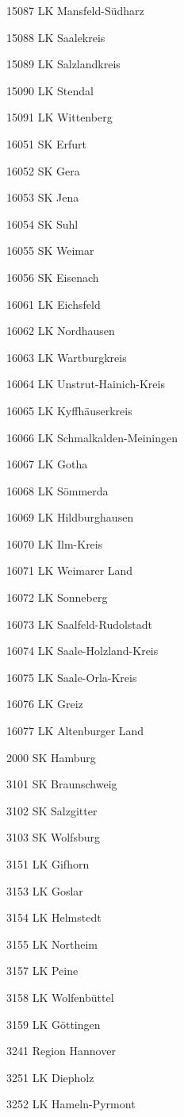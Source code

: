 15087  LK Mansfeld-Südharz

15088  LK Saalekreis

15089  LK Salzlandkreis

15090  LK Stendal

15091  LK Wittenberg

16051  SK Erfurt

16052  SK Gera

16053  SK Jena

16054  SK Suhl

16055  SK Weimar

16056  SK Eisenach

16061  LK Eichsfeld

16062  LK Nordhausen

16063  LK Wartburgkreis

16064  LK Unstrut-Hainich-Kreis

16065  LK Kyffhäuserkreis

16066  LK Schmalkalden-Meiningen

16067  LK Gotha

16068  LK Sömmerda

16069  LK Hildburghausen

16070  LK Ilm-Kreis

16071  LK Weimarer Land

16072  LK Sonneberg

16073  LK Saalfeld-Rudolstadt

16074  LK Saale-Holzland-Kreis

16075  LK Saale-Orla-Kreis

16076  LK Greiz

16077  LK Altenburger Land

2000  SK Hamburg

3101  SK Braunschweig

3102  SK Salzgitter

3103  SK Wolfsburg

3151  LK Gifhorn

3153  LK Goslar

3154  LK Helmstedt

3155  LK Northeim

3157  LK Peine

3158  LK Wolfenbüttel

3159  LK Göttingen

3241  Region Hannover

3251  LK Diepholz

3252  LK Hameln-Pyrmont


